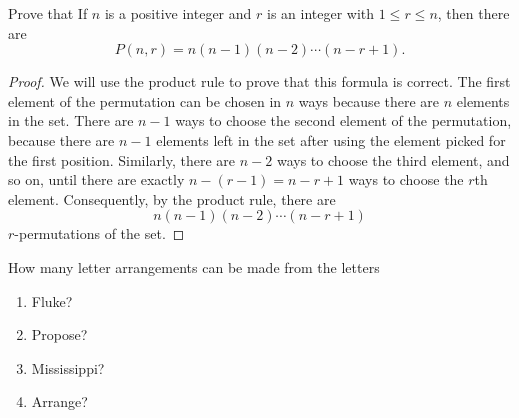         \begin{exercise}
            Prove that If $n$ is a positive integer and $r$ is an integer with $1\leq r\leq n$, then there are
            $$
            P(n,r)=n(n-1)(n-2)\cdots(n-r+1).
            $$
        \end{exercise}
        \begin{proof}
            We will use the product rule to prove that this formula is correct. The first element of the permutation can be chosen in $n$ ways because there are $n$ elements in the set. There are $n-1$ ways to choose the second element of the permutation, because there are $n-1$ elements left in the set after using the element picked for the first position. Similarly, there are $n-2$ ways to choose the third element, and so on, until there are exactly $n-(r-1)=n-r+1$ ways to choose the $r$th element. Consequently, by the product rule, there are
            $$
            n(n-1)(n-2)\cdots(n-r+1)
            $$
            $r$-permutations of the set.
        \end{proof}

        \begin{exercise}
            How many letter arrangements can be made from the letters
            \begin{enumerate}[label=(\alph*)]
            \item Fluke?
            \item Propose?
            \item Mississippi?
            \item Arrange?
            \end{enumerate}
        \end{exercise}

